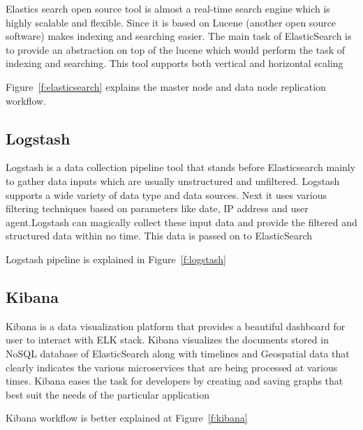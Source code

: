 Elastics search open source tool is almost a real-time search engine which is 
highly scalable and flexible. Since it is based on Lucene 
(another open source software) makes indexing and searching easier. The main 
task of ElasticSearch is to provide an abstraction on top of the lucene which 
would perform the task of indexing and searching. This tool supports both 
vertical and horizontal scaling~\cite{hid-sp18-410-elk-components}  

Figure~\ref{f:elasticsearch} explains the master node and data node 
replication workflow.

\subsection{Logstash}

Logstash is a data collection pipeline tool that stands before Elasticsearch 
mainly to gather data inputs which are usually unstructured and unfiltered. 
Logstash supports a wide variety of data type and data sources. Next it uses 
various filtering techniques based on parameters like date, IP address and user 
agent.Logstash can magically collect these input data and provide the filtered 
and structured data within no time. This data is passed on to ElasticSearch 
~\cite{hid-sp18-410-elk-components}

Logstash pipeline is explained in Figure~\ref{f:logstash}


\subsection{Kibana}

Kibana is a data visualization platform that provides a beautiful dashboard for 
user to interact with ELK stack. Kibana visualizes the documents stored in NoSQL
 database of ElasticSearch along with timelines and Geospatial data that clearly
 indicates the various microservices that are being processed at various times.
  Kibana eases the task for developers by creating and saving graphs that best 
suit the needs of the particular application
~\cite{hid-sp18-410-elk-components}

Kibana workflow is better explained at Figure~\ref{f:kibana}


